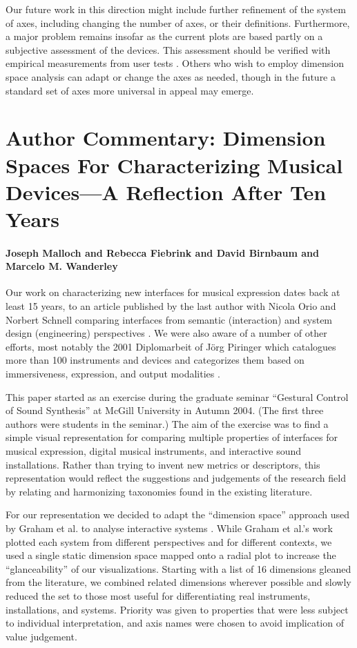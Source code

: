 {{Our future work in this direction might include further refinement of the system of axes, including changing the number of axes, or their definitions. Furthermore, a major problem remains insofar as the current plots are based partly on a subjective assessment of the devices. This assessment should be verified with empirical measurements from user tests \cite{Wanderley:2000}. Others who wish to employ dimension space analysis can adapt or change the axes as needed, though in the future a standard set of axes more universal in appeal may emerge.

\section*{Author Commentary: Dimension Spaces For Characterizing Musical Devices---A Reflection After Ten Years}

\paragraph{Joseph Malloch and Rebecca Fiebrink and David Birnbaum and Marcelo M. Wanderley}

Our work on characterizing new interfaces for musical expression dates back at least 15 years, to an article published by the last author with Nicola Orio and Norbert Schnell comparing interfaces from semantic (interaction) and system design (engineering) perspectives \cite{Wanderley:2000}. We were also aware of a number of other efforts, most notably the 2001 Diplomarbeit of J\"{o}rg Piringer which catalogues more than 100 instruments and devices and categorizes them based on immersiveness, expression, and output modalities \cite{Piringer:2001}.

This paper started as an exercise during the graduate seminar ``Gestural Control of Sound Synthesis'' at McGill University in Autumn 2004. (The first three authors were students in the seminar.) The aim of the exercise was to find a simple visual representation for comparing multiple properties of interfaces for musical expression, digital musical instruments, and interactive sound installations. Rather than trying to invent new metrics or descriptors, this representation would reflect the suggestions and judgements of the research field by relating and harmonizing taxonomies found in the existing literature.

For our representation we decided to adapt the ``dimension space'' approach used by Graham et al. to analyse interactive systems \cite{Graham:2000}. While Graham et al.'s work plotted each system from different perspectives and for different contexts, we used a single static dimension space mapped onto a radial plot to increase the ``glanceability'' of our visualizations. Starting with a list of 16 dimensions gleaned from the literature, we combined related dimensions wherever possible and slowly reduced the set to those most useful for differentiating real instruments, installations, and systems. Priority was given to properties that were less subject to individual interpretation, and axis names were chosen to avoid implication of value judgement.

}}
